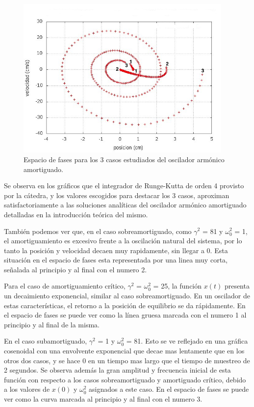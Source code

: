 \documentclass[a4paper,12pt]{article}
\begin{document}
\begin{figure}[H]
\begin{center}
\includegraphics[height=8cm]{grafico_ej2_xVSv.jpg}
\caption[width=5cm]{Espacio de fases para los 3 casos estudiados del oscilador arm\'onico amortiguado.}
\end{center}
\end{figure}

Se observa en los gr\'aficos que el integrador de Runge-Kutta de orden 4 provisto por la c\'atedra, y los valores escogidos para destacar los 3 casos, aproximan satisfactoriamente a las soluciones anal\'iticas del oscilador arm\'onico amortiguado detalladas en la introducci\'on te\'orica del mismo.

Tambi\'en podemos ver que, en el caso sobreamortiguado, como $\gamma^2$ = 81 y $\omega_0^2$ = 1, el amortiguamiento es excesivo frente a la oscilaci\'on natural del sistema, por lo tanto la posici\'on y velocidad decaen muy rapidamente, sin llegar a 0. Esta situaci\'on en el espacio de fases esta representada por una linea muy corta, se\~nalada al principio y al final con el numero 2.

Para el caso de amortiguamiento cr\'itico, $\gamma^2$ = $\omega_0^2$ = 25, la funci\'on $x(t)$ presenta un decaimiento exponencial, similar al caso sobreamortiguado. En un oscilador de estas caracter\'isticas, el retorno a la posici\'on de equilibrio se da r\'apidamente. En el espacio de fases se puede ver como la l\'inea gruesa marcada con el numero 1 al principio y al final de la misma.

En el caso subamortiguado, $\gamma^2$ = 1 y $\omega_0^2$ = 81. Esto se ve reflejado en una gr\'afica cosenoidal con una envolvente exponencial que decae mas lentamente que en los otros dos casos, y se hace 0 en un tiempo mas largo que el tiempo de muestreo de 2 segundos. \newline
Se observa adem\'as la gran amplitud y frecuencia inicial de esta funci\'on con respecto a los casos sobreamortiguado y amortiguado cr\'itico, debido a los valores de ${x}(0)$ y $\omega_0^2$ asignados a este caso. En el espacio de fases se puede ver como la curva marcada al principio y al final con el numero 3.
\end{document}
